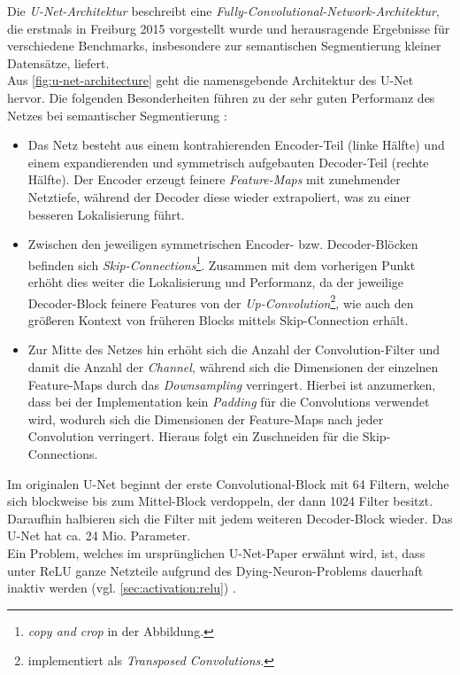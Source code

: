 Die \textit{U-Net-Architektur} beschreibt eine \textit{Fully-Convolutional-Network-Architektur}, die erstmals in Freiburg 2015 vorgestellt wurde 
und herausragende Ergebnisse für verschiedene Benchmarks, insbesondere zur semantischen Segmentierung kleiner Datensätze, liefert. \\
Aus \autoref{fig:u-net-architecture} geht die namensgebende Architektur des U-Net hervor. Die folgenden Besonderheiten 
führen zu der sehr guten Performanz des Netzes bei semantischer Segmentierung \cite{Ronneberger.18052015}:
\begin{itemize}
	\item Das Netz besteht aus einem kontrahierenden Encoder-Teil (linke Hälfte) und einem expandierenden und symmetrisch aufgebauten
	Decoder-Teil (rechte Hälfte). Der Encoder erzeugt feinere \textit{Feature-Maps} mit zunehmender Netztiefe, 
	während der Decoder diese wieder extrapoliert, was zu einer besseren Lokalisierung führt. 
	\item Zwischen den jeweiligen symmetrischen Encoder- bzw. Decoder-Blöcken befinden sich \textit{Skip-Connections}\footnote{\textit{copy and crop} in der Abbildung.}.
	Zusammen mit dem vorherigen Punkt erhöht dies weiter die Lokalisierung und Performanz, da der jeweilige Decoder-Block feinere Features von der \textit{Up-Convolution}\footnote{implementiert als \textit{Transposed Convolutions}.},
	wie auch den größeren Kontext von früheren Blocks mittels Skip-Connection erhält. 
	\item Zur Mitte des Netzes hin erhöht sich die Anzahl der Convolution-Filter und damit die Anzahl der \textit{Channel}, 
	während sich die Dimensionen der einzelnen Feature-Maps durch das \textit{Downsampling} verringert. 
	Hierbei ist anzumerken, dass bei der Implementation kein \textit{Padding} für die Convolutions verwendet wird,
	wodurch sich die Dimensionen der Feature-Maps nach jeder Convolution verringert. 
	Hieraus folgt ein Zuschneiden für die Skip-Connections. 
\end{itemize}

Im originalen U-Net beginnt der erste Convolutional-Block mit 64 Filtern, welche
sich blockweise bis zum Mittel-Block verdoppeln, der dann 1024 Filter
besitzt. Daraufhin halbieren sich die Filter mit jedem weiteren Decoder-Block
wieder.
Das U-Net hat ca. 24 Mio. Parameter. \\
Ein Problem, welches im ursprünglichen U-Net-Paper erwähnt wird, ist, dass unter \ac{ReLU} ganze Netzteile aufgrund des Dying-Neuron-Problems dauerhaft inaktiv 
werden (vgl. \autoref{sec:activation:relu}) \cite{Ronneberger.18052015}.

